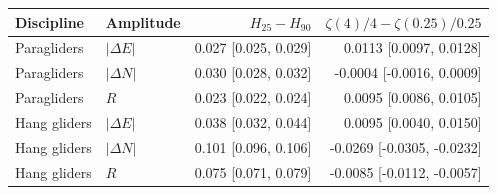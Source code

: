 \begin{tabular}{llrr}
\toprule
Discipline & Amplitude & $H_{25}-H_{90}$ & $\zeta(4)/4-\zeta(0.25)/0.25$\\
\midrule
Paragliders & $|\Delta E|$ & 0.027 [0.025, 0.029] & 0.0113 [0.0097, 0.0128]\\
Paragliders & $|\Delta N|$ & 0.030 [0.028, 0.032] & -0.0004 [-0.0016, 0.0009]\\
Paragliders & $R$ & 0.023 [0.022, 0.024] & 0.0095 [0.0086, 0.0105]\\
Hang gliders & $|\Delta E|$ & 0.038 [0.032, 0.044] & 0.0095 [0.0040, 0.0150]\\
Hang gliders & $|\Delta N|$ & 0.101 [0.096, 0.106] & -0.0269 [-0.0305, -0.0232]\\
Hang gliders & $R$ & 0.075 [0.071, 0.079] & -0.0085 [-0.0112, -0.0057]\\
\bottomrule
\end{tabular}
